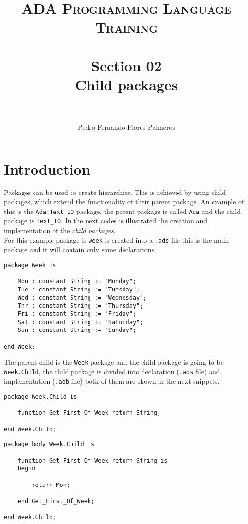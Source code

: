 \documentclass[paper=a4, fontsize=11pt]{scrartcl} %
\title{	
\normalfont \normalsize 
\textsc{ADA Programming Language Training} \\ [25pt] %
\horrule{0.5pt} \\[0.4cm] %
\huge Section 02 \\ Child packages\\ %
\horrule{2pt} \\[0.5cm] %
}
\author{Pedro Fernando Flores Palmeros} %
\date{} %
\numberwithin{equation}{section} %
\numberwithin{figure}{section} %
\numberwithin{table}{section} %
\begin{document}
\maketitle %
 

\section{Introduction}
Packages can be used to create hierarchies. This is achieved by using child packages, which extend the functionality of their parent package. An example of this is the \verb|Ada.Text_IO| package, the parent package is called \verb|Ada| and the child package is \verb|Text_IO|. In the next codes is illustrated the creation and implementation of the \textit{child packages}.\\

For this example package is \verb|week| is created into a \verb|.ads| file this is the main package and it will contain only some declarations.



\begin{lstlisting}[caption = {week.ads}, label = {program_01}]
package Week is

	Mon : constant String := "Monday";
	Tue : constant String := "Tuesday";
	Wed : constant String := "Wednesday"; 
	Thr : constant String := "Thursday";
	Fri : constant String := "Friday"; 
	Sat : constant String := "Saturday"; 
	Sun : constant String := "Sunday"; 

end Week;
\end{lstlisting}

The parent child is the \verb|Week| package and the child package is going to be \verb|Week.Child|, the child package is divided into declaration (\verb|.ads| file) and implementation (\verb|.adb| file) both of them are shown in the next snippets.

\begin{lstlisting}[caption = {week-child.ads}, label = {program_02}]
package Week.Child is

	function Get_First_Of_Week return String; 
	
end Week.Child;
\end{lstlisting}

\begin{lstlisting}[caption = {week-child.adb}, label = {program_03}]
package body Week.Child is 

	function Get_First_Of_Week return String is
	begin 

		return Mon;

	end Get_First_Of_Week;

end Week.Child;
\end{lstlisting}
\end{document}
